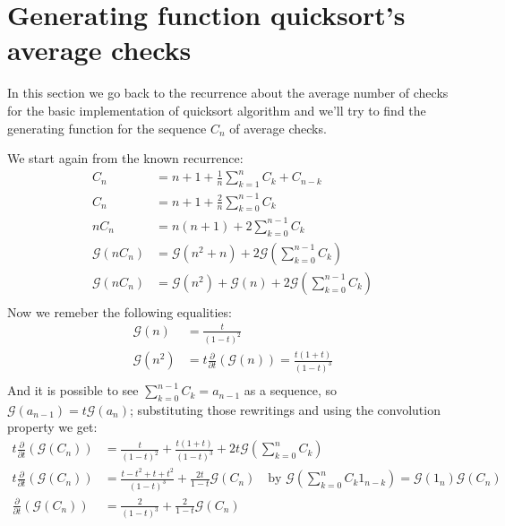 
\section{Generating function quicksort's average checks }
In this section we go back to the recurrence about the average number
of checks for the basic implementation of quicksort algorithm and
we'll try to find the generating function for the sequence $C_n$ of
average checks.

We start again from the known recurrence:
\begin{displaymath}
  \begin{split}
    C_n &= n+1 +  \frac{1}{n}\sum_{k=1}^{n}{C_k + C_{n-k}}  \\
    C_n &= n+1 +  \frac{2}{n}\sum_{k=0}^{n-1}{C_k}  \\
    nC_n &= n(n+1) + 2\sum_{k=0}^{n-1}{C_k}  \\
    \mathcal{G} (nC_n) &= \mathcal{G} (n^2+n) +
    2\mathcal{G} \left(\sum_{k=0}^{n-1}{C_k} \right) \\
    \mathcal{G} (nC_n) &= \mathcal{G} (n^2) +\mathcal{G} (n) +
    2\mathcal{G} \left(\sum_{k=0}^{n-1}{C_k} \right) \\
  \end{split}
\end{displaymath}
Now we remeber the following equalities:
\begin{displaymath}
  \begin{split}
    \mathcal{G} (n) &=  \frac{t}{(1-t)^2} \\
    \mathcal{G} (n^2) &=
    t\frac{\partial}{\partial t}(\mathcal{G} (n)) =
    \frac{t(1+t)}{(1-t)^3} \\
  \end{split}
\end{displaymath}
And it is possible to see $\sum_{k=0}^{n-1}{C_k} = a_{n-1}$ as a
sequence, so $\mathcal{G} (a_{n-1}) = t \mathcal{G} (a_n)$;
substituting those rewritings and using the convolution property we
get:
\begin{displaymath}
  \begin{split}
    t \frac{\partial}{\partial t}\left( \mathcal{G} (C_n) \right) &=
    \frac{t}{(1-t)^2} + \frac{t(1+t)}{(1-t)^3} + 2t\mathcal{G}
    \left(\sum_{k=0}^{n}{C_k} \right)\\
    t \frac{\partial}{\partial t}\left( \mathcal{G} (C_n) \right) &=
    \frac{t -t^2+ t+t^2}{(1-t)^3} + \frac{2t}{1-t} \mathcal{G}
    \left(C_n \right) \quad \text{by } \mathcal{G}
    \left(\sum_{k=0}^{n}{C_k 1_{n-k}} \right)=\mathcal{G} (1_n)\mathcal{G} (C_n)\\
    \frac{\partial}{\partial t}\left( \mathcal{G} (C_n) \right) &=
    \frac{2}{(1-t)^3} + \frac{2}{1-t} \mathcal{G}
    \left(C_n \right)\\
  \end{split}
\end{displaymath}
